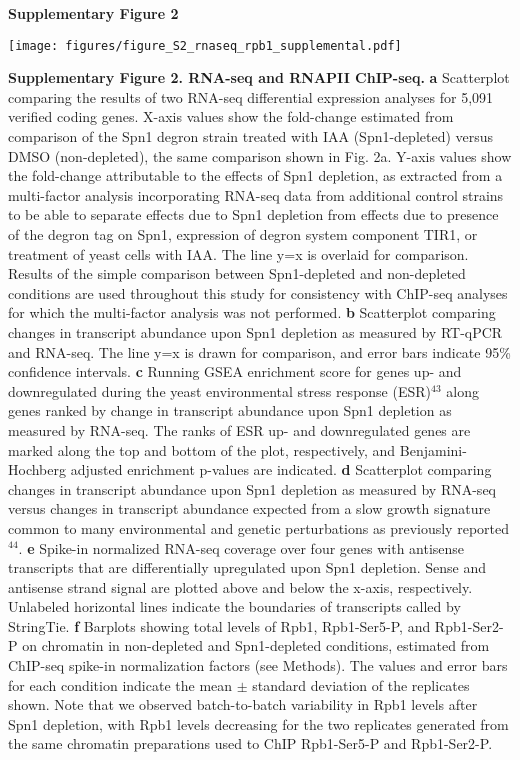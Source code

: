 \documentclass[8pt]{extarticle}
\begin{document}
\newpage

\textbf{\large Supplementary Figure 2}

{\texttt{[image: figures/figure\_S2\_rnaseq\_rpb1\_supplemental.pdf]}\par}

\vspace{2em}
\textbf{Supplementary Figure 2. RNA-seq and RNAPII ChIP-seq.}
\textbf{a} Scatterplot comparing the results of two RNA-seq differential expression analyses for 5,091 verified coding genes.
X-axis values show the fold-change estimated from comparison of the Spn1 degron strain treated with IAA (Spn1-depleted) versus DMSO (non-depleted), the same comparison shown in Fig. 2a.
Y-axis values show the fold-change attributable to the effects of Spn1 depletion, as extracted from a multi-factor analysis incorporating RNA-seq data from additional control strains to be able to separate effects due to Spn1 depletion from effects due to presence of the degron tag on Spn1, expression of degron system component TIR1, or treatment of yeast cells with IAA.
The line y=x is overlaid for comparison.
Results of the simple comparison between Spn1-depleted and non-depleted conditions are used throughout this study for consistency with ChIP-seq analyses for which the multi-factor analysis was not performed.
\textbf{b} Scatterplot comparing changes in transcript abundance upon Spn1 depletion as measured by RT-qPCR and RNA-seq. The line y=x is drawn for comparison, and error bars indicate 95\% confidence intervals.
\textbf{c} Running GSEA enrichment score for genes up- and downregulated during the yeast environmental stress response (ESR)$^{43}$ along genes ranked by change in transcript abundance upon Spn1 depletion as measured by RNA-seq.
The ranks of ESR up- and downregulated genes are marked along the top and bottom of the plot, respectively, and Benjamini-Hochberg adjusted enrichment p-values are indicated.
\textbf{d} Scatterplot comparing changes in transcript abundance upon Spn1 depletion as measured by RNA-seq versus changes in transcript abundance expected from a slow growth signature common to many environmental and genetic perturbations as previously reported$^{44}$.
\textbf{e} Spike-in normalized RNA-seq coverage over four genes with antisense transcripts that are differentially upregulated upon Spn1 depletion.
Sense and antisense strand signal are plotted above and below the x-axis, respectively.
Unlabeled horizontal lines indicate the boundaries of transcripts called by StringTie.
\textbf{f} Barplots showing total levels of Rpb1, Rpb1-Ser5-P, and Rpb1-Ser2-P on chromatin in non-depleted and Spn1-depleted conditions, estimated from ChIP-seq spike-in normalization factors (see Methods).
The values and error bars for each condition indicate the mean $\pm$ standard deviation of the replicates shown.
Note that we observed batch-to-batch variability in Rpb1 levels after Spn1 depletion, with Rpb1 levels decreasing for the two replicates generated from the same chromatin preparations used to ChIP Rpb1-Ser5-P and Rpb1-Ser2-P.
\end{document}
